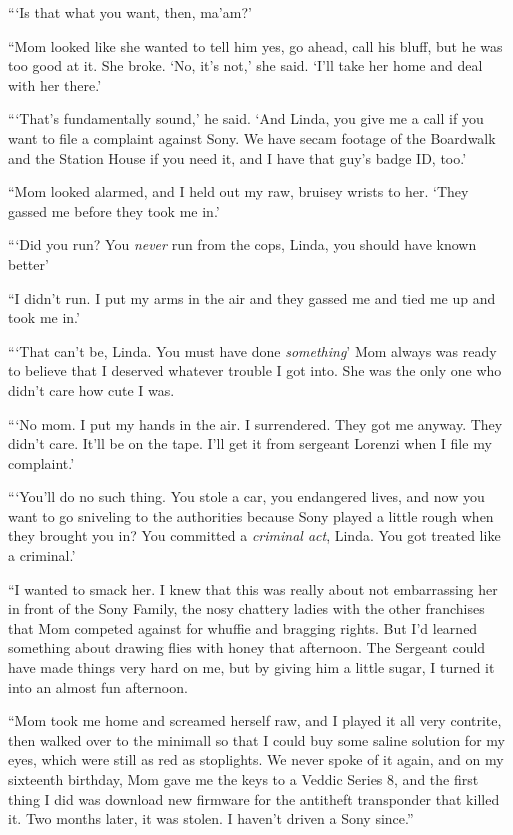 “‘Is that what you want, then, ma’am?’

“Mom looked like she wanted to tell him yes, go ahead, call his
bluff, but he was too good at it. She broke. ‘No, it’s not,’ she
said. ‘I’ll take her home and deal with her there.’

“‘That’s fundamentally sound,’ he said. ‘And Linda, you give me a
call if you want to file a complaint against Sony. We have secam
footage of the Boardwalk and the Station House if you need it, and
I have that guy’s badge ID, too.’

“Mom looked alarmed, and I held out my raw, bruisey wrists to her.
‘They gassed me before they took me in.’

“‘Did you run? You \emph{never} run from the cops, Linda, you
should have known better{\dash}’

“I didn’t run. I put my arms in the air and they gassed me and tied
me up and took me in.’

“‘That can’t be, Linda. You must have done \emph{something}{\dash}’ Mom
always was ready to believe that I deserved whatever trouble I got
into. She was the only one who didn’t care how cute I was.

“‘No mom. I put my hands in the air. I surrendered. They got me
anyway. They didn’t care. It’ll be on the tape. I’ll get it from
sergeant Lorenzi when I file my complaint.’

“‘You’ll do no such thing. You stole a car, you endangered lives,
and now you want to go sniveling to the authorities because Sony
played a little rough when they brought you in? You committed a
\emph{criminal act}, Linda. You got treated like a criminal.’

“I wanted to smack her. I knew that this was really about not
embarrassing her in front of the Sony Family, the nosy chattery
ladies with the other franchises that Mom competed against for
whuffie and bragging rights. But I’d learned something about
drawing flies with honey that afternoon. The Sergeant could have
made things very hard on me, but by giving him a little sugar, I
turned it into an almost fun afternoon.

“Mom took me home and screamed herself raw, and I played it all
very contrite, then walked over to the minimall so that I could buy
some saline solution for my eyes, which were still as red as
stoplights. We never spoke of it again, and on my sixteenth
birthday, Mom gave me the keys to a Veddic Series 8, and the first
thing I did was download new firmware for the antitheft transponder
that killed it. Two months later, it was stolen. I haven’t driven a
Sony since.”


